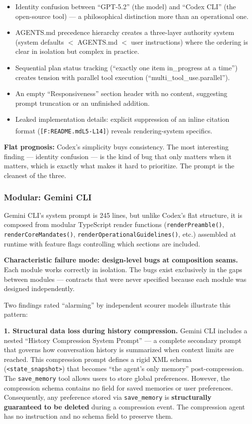 \begin{itemize}
\tightlist
\item
  Identity confusion between ``GPT-5.2'' (the model) and ``Codex CLI''
  (the open-source tool) --- a philosophical distinction more than an
  operational one.
\item
  AGENTS.md precedence hierarchy creates a three-layer authority system
  (system defaults $<$ AGENTS.md $<$ user instructions)
  where the ordering is clear in isolation but complex in practice.
\item
  Sequential plan status tracking (``exactly one item in\_progress at a
  time'') creates tension with parallel tool execution
  (``multi\_tool\_use.parallel'').
\item
  An empty ``Responsiveness'' section header with no content, suggesting
  prompt truncation or an unfinished addition.
\item
  Leaked implementation details: explicit suppression of an inline
  citation format (\texttt{[F:README.md\textsuperscript{\dag}L5-L14]}) reveals rendering-system
  specifics.
\end{itemize}

\textbf{Flat prognosis:} Codex's simplicity buys consistency. The most
interesting finding --- identity confusion --- is the kind of bug that
only matters when it matters, which is exactly what makes it hard to
prioritize. The prompt is the cleanest of the three.

\subsubsection{Modular: Gemini CLI}

Gemini CLI's system prompt is 245 lines, but unlike Codex's flat
structure, it is composed from modular TypeScript render functions
(\texttt{renderPreamble()}, \texttt{renderCoreMandates()},
\texttt{renderOperationalGuidelines()}, etc.) assembled at runtime with
feature flags controlling which sections are included.

\textbf{Characteristic failure mode: design-level bugs at composition
seams.} Each module works correctly in isolation. The bugs exist
exclusively in the gaps between modules --- contracts that were never
specified because each module was designed independently.

Two findings rated ``alarming'' by independent scourer models illustrate
this pattern:

\textbf{1. Structural data loss during history compression.} Gemini CLI
includes a nested ``History Compression System Prompt'' --- a complete
secondary prompt that governs how conversation history is summarized
when context limits are reached. This compression prompt defines a rigid
XML schema (\texttt{<state\_snapshot>}) that
becomes ``the agent's only memory'' post-compression. The
\texttt{save\_memory} tool allows users to store global preferences.
However, the compression schema contains no field for saved memories or
user preferences. Consequently, any preference stored via
\texttt{save\_memory} is \textbf{structurally guaranteed to be deleted}
during a compression event. The compression agent has no instruction and
no schema field to preserve them.

